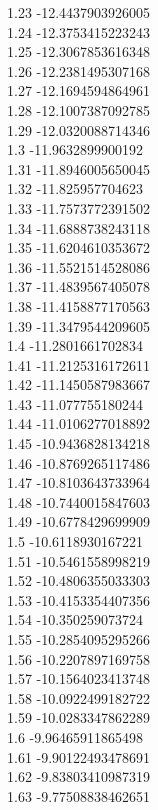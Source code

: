 {1.23	-12.4437903926005\\
1.24	-12.3753415223243\\
1.25	-12.3067853616348\\
1.26	-12.2381495307168\\
1.27	-12.1694594864961\\
1.28	-12.1007387092785\\
1.29	-12.0320088714346\\
1.3	-11.9632899900192\\
1.31	-11.8946005650045\\
1.32	-11.825957704623\\
1.33	-11.7573772391502\\
1.34	-11.6888738243118\\
1.35	-11.6204610353672\\
1.36	-11.5521514528086\\
1.37	-11.4839567405078\\
1.38	-11.4158877170563\\
1.39	-11.3479544209605\\
1.4	-11.2801661702834\\
1.41	-11.2125316172611\\
1.42	-11.1450587983667\\
1.43	-11.077755180244\\
1.44	-11.0106277018892\\
1.45	-10.9436828134218\\
1.46	-10.8769265117486\\
1.47	-10.8103643733964\\
1.48	-10.7440015847603\\
1.49	-10.6778429699909\\
1.5	-10.6118930167221\\
1.51	-10.5461558998219\\
1.52	-10.4806355033303\\
1.53	-10.4153354407356\\
1.54	-10.350259073724\\
1.55	-10.2854095295266\\
1.56	-10.2207897169758\\
1.57	-10.1564023413748\\
1.58	-10.0922499182722\\
1.59	-10.0283347862289\\
1.6	-9.96465911865498\\
1.61	-9.90122493478691\\
1.62	-9.83803410987319\\
1.63	-9.77508838462651\\
}
